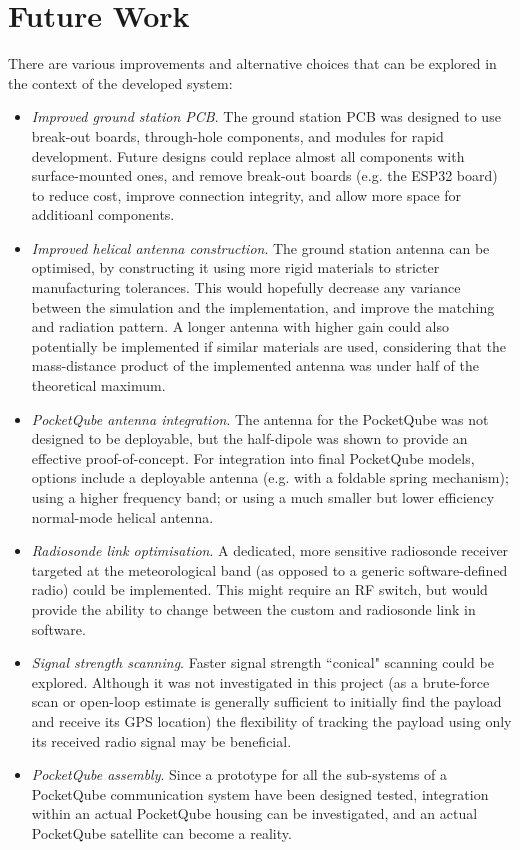 \section{Future Work}\label{sec:future_work}

There are various improvements and alternative choices that can be explored in the context of the developed system:
\begin{itemize}
    \item \textit{Improved ground station PCB}. The ground station PCB was designed to use break-out boards, through-hole components, and modules for rapid development. Future designs could replace almost all components with surface-mounted ones, and remove break-out boards (e.g. the ESP32 board) to reduce cost, improve connection integrity, and allow more space for additioanl components.
    \item \textit{Improved helical antenna construction}. The ground station antenna can be optimised, by constructing it using more rigid materials to stricter manufacturing tolerances. This would hopefully decrease any variance between the simulation and the implementation, and improve the matching and radiation pattern. A longer antenna with higher gain could also potentially be implemented if similar materials are used, considering that the mass-distance product of the implemented antenna was under half of the theoretical maximum.
    \item \textit{PocketQube antenna integration}. The antenna for the PocketQube was not designed to be deployable, but the half-dipole was shown to provide an effective proof-of-concept. For integration into final PocketQube models, options include a deployable antenna (e.g. with a foldable spring mechanism); using a higher frequency band; or using a much smaller but lower efficiency normal-mode helical antenna.
    \item \textit{Radiosonde link optimisation}. A dedicated, more sensitive radiosonde receiver targeted at the meteorological band (as opposed to a generic software-defined radio) could be implemented. This might require an RF switch, but would provide the ability to change between the custom and radiosonde link in software.
    \item \textit{Signal strength scanning}. Faster signal strength ``conical" scanning could be explored. Although it was not investigated in this project (as a brute-force scan or open-loop estimate is generally sufficient to initially find the payload and receive its GPS location) the flexibility of tracking the payload using only its received radio signal may be beneficial.
    \item \textit{PocketQube assembly}. Since a prototype for all the sub-systems of a PocketQube communication system have been designed tested, integration within an actual PocketQube housing can be investigated, and an actual PocketQube satellite can become a reality.
\end{itemize}